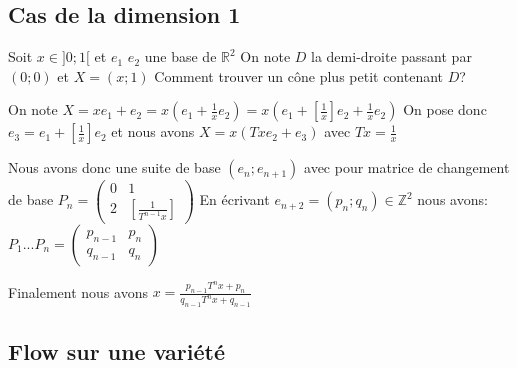 \subsection{Cas de la dimension 1}

Soit $x \in ]0;1[$ et $e_1$ $e_2$ une base de $\mathbb{R}^2$
On note $D$ la demi-droite passant par $(0;0)$ et $X=(x;1)$
Comment trouver un cône plus petit contenant $D$?

On note $X=xe_1+e_2=x(e_1+\frac{1}{x}e_2)=x(e_1+[\frac{1}{x}]e_2+{\frac{1}{x}}e_2)$
On pose donc $e_3=e_1+[\frac{1}{x}]e_2$ et nous avons $X=x(Txe_2+e_3)$ avec $Tx={\frac{1}{x}}$

Nous avons donc une suite de base $(e_n;e_{n+1})$ avec pour matrice de changement de base $P_n=
\begin{pmatrix}
   0 & 1 \\
   2 & [\frac{1}{T^{n-1}x}]
\end{pmatrix}$
En écrivant $e_{n+2}=(p_n;q_n)\in \mathbb{Z}^2$ nous avons:
$P_1...P_n=
\begin{pmatrix}
  p_{n-1} & p_n \\
  q_{n-1} & q_n
\end{pmatrix}$

Finalement nous avons $x=\frac{p_{n-1}T^n {x}+p_n}{q_{n-1}T^n x+q_{n-1}}$
\subsection{Flow sur une variété}
